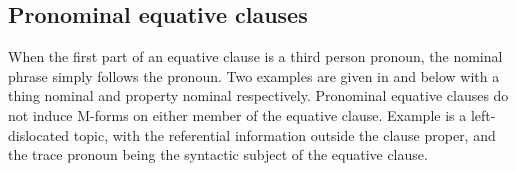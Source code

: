 %

\subsection{Pronominal equative clauses}\label{sec:ProEquCla}
When the first part of an equative clause is a third person pronoun,
the nominal phrase simply follows the pronoun.
Two examples are given in  and  below
with a thing nominal and property nominal respectively.
Pronominal equative clauses do not induce M-forms
on either member of the equative clause.
Example  is a left-dislocated topic,
with the referential information outside the clause proper,
and the trace pronoun being the syntactic subject of the equative clause.

